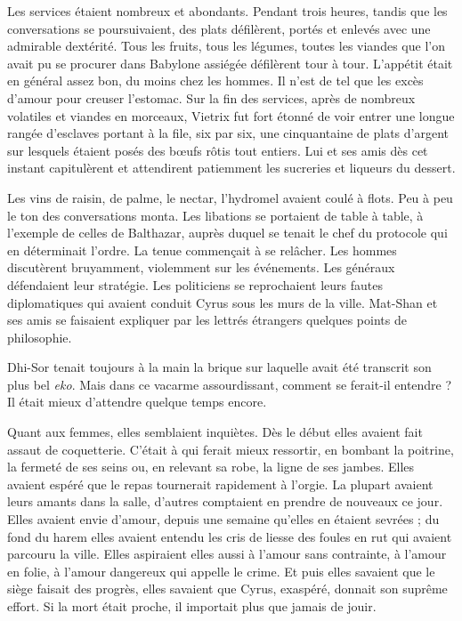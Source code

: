 \documentclass[a4paper, 11pt, oneside, polutonikogreek, french]{article}
\begin{document}
\bigskip
\centerline{\EightStarTaper}
\centerline{\EightStarTaper\EightStarTaper}
\bigskip

Les services étaient nombreux et abondants. Pendant trois heures, tandis que les conversations se poursuivaient, des plats défilèrent, portés et enlevés avec une admirable dextérité. Tous les fruits, tous les légumes, toutes les viandes que l'on avait pu se procurer dans Babylone assiégée défilèrent tour à tour. L'appétit était en général assez bon, du moins chez les hommes. Il n'est de tel que les excès d'amour pour creuser l'estomac. Sur la fin des services, après de nombreux volatiles et viandes en morceaux, Vietrix fut fort étonné de voir entrer une longue rangée d'esclaves portant à la file, six par six, une cinquantaine de plats d'argent sur lesquels étaient posés des bœufs rôtis tout entiers. Lui et ses amis dès cet instant capitulèrent et attendirent patiemment les sucreries et liqueurs du dessert.

\bigskip
\centerline{\EightStarTaper}
\centerline{\EightStarTaper\EightStarTaper}
\bigskip

Les vins de raisin, de palme, le nectar, l'hydromel avaient coulé à flots. Peu à peu le ton des conversations monta. Les libations se portaient de table à table, à l'exemple de celles de Balthazar, auprès duquel se tenait le chef du protocole qui en déterminait l'ordre. La tenue commençait à se relâcher. Les hommes discutèrent bruyamment, violemment sur les événements. Les généraux défendaient leur stratégie. Les politiciens se reprochaient leurs fautes diplomatiques qui avaient conduit Cyrus sous les murs de la ville. Mat-Shan et ses amis se faisaient expliquer par les lettrés étrangers quelques points de philosophie.

Dhi-Sor tenait toujours à la main la brique sur laquelle avait été transcrit son plus bel \emph{eko}. Mais dans ce vacarme assourdissant, comment se ferait-il entendre ? Il était mieux d'attendre quelque temps encore.

\bigskip
\centerline{\EightStarTaper}
\centerline{\EightStarTaper\EightStarTaper}
\bigskip

Quant aux femmes, elles semblaient inquiètes. Dès le début elles avaient fait assaut de coquetterie. C'était à qui ferait mieux ressortir, en bombant la poitrine, la fermeté de ses seins ou, en relevant sa robe, la ligne de ses jambes. Elles avaient espéré que le repas tournerait rapidement à l'orgie. La plupart avaient leurs amants dans la salle, d'autres comptaient en prendre de nouveaux ce jour. Elles avaient envie d'amour, depuis une semaine qu'elles en étaient sevrées ; du fond du harem elles avaient entendu les cris de liesse des foules en rut qui avaient parcouru la ville. Elles aspiraient elles aussi à l'amour sans contrainte, à l'amour en folie, à l'amour dangereux qui appelle le crime. Et puis elles savaient que le siège faisait des progrès, elles savaient que Cyrus, exaspéré, donnait son suprême effort. Si la mort était proche, il importait plus que jamais de jouir.
\end{document}
